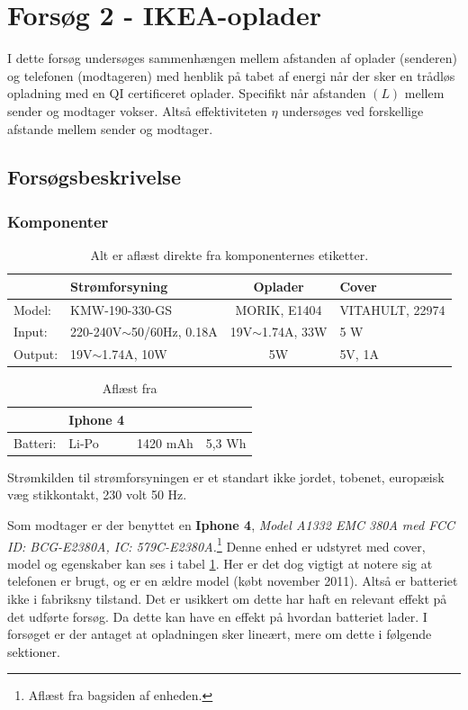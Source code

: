 \section{Forsøg 2 - IKEA-oplader} \label{sec:forsg2}

I dette forsøg undersøges sammenhængen mellem afstanden af oplader (senderen) og telefonen (modtageren) med henblik på tabet af energi når der sker en trådløs opladning med en QI certificeret oplader. Specifikt når afstanden $(L)$ mellem sender og modtager vokser. Altså effektiviteten $\eta$ undersøges ved forskellige afstande mellem sender og modtager.

\subsection{Forsøgsbeskrivelse} 
\subsubsection{Komponenter}

\begin{table}[htbp] %
\begin{tabular}{l|l|c|l}
        & Strømforsyning               & Oplader             & Cover               \\ \hline
Model:  & KMW-190-330-GS               & MORIK, E1404        & VITAHULT, 22974     \\
Input:  & 220-240V$\sim$50/60Hz, 0.18A & 19V$\sim$1.74A, 33W & 5 W       \\	
Output: & 19V$\sim$1.74A, 10W          & 5W                  & 5V, 1A             
\end{tabular}
\caption{Alt er aflæst direkte fra komponenternes etiketter.}
\label{table:sender}
\end{table}


\begin{table}[htbp]
\begin{tabular}{l|lcl}
         & Iphone 4 &          &        \\ \hline
Batteri: & Li-Po     & 1420 mAh & 5,3 Wh
\end{tabular}
\caption{Aflæst fra \cite{batteri}}
\label{table:batteri}
\end{table}

Strømkilden til strømforsyningen er et standart ikke jordet, tobenet, europæisk væg stikkontakt, 230 volt 50 Hz.

Som modtager er der benyttet en \textbf{Iphone 4}, \textit{Model A1332 EMC 380A med FCC ID: BCG-E2380A, IC: 579C-E2380A.}\footnote{Aflæst fra bagsiden af enheden.}
Denne enhed er udstyret med cover, model og egenskaber kan ses i tabel \ref{table:sender}. Her er det dog vigtigt at notere sig at telefonen er brugt, og er en ældre model (købt november 2011). Altså er batteriet ikke i fabriksny tilstand. Det er usikkert om dette har haft en relevant effekt på det udførte forsøg. Da dette kan have en effekt på hvordan batteriet lader. I forsøget er der antaget at opladningen sker lineært, mere om dette i følgende sektioner.

